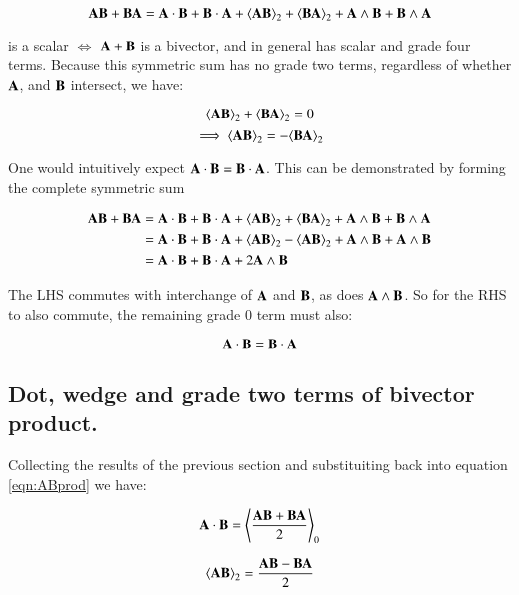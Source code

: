\documentclass{article}      %
\newcommand{\gpgrade}[2] {{\left\langle{{#1}}\right\rangle}_{#2}}
\newcommand{\gpgradetwo}[1] {\gpgrade{#1}{2}}
\begin{document}
\[
\BA \BB + \BB \BA = 
\BA \cdot \BB + \BB \cdot \BA
+\gpgradetwo{\BA \BB} + \gpgradetwo{\BB \BA}
+\BA \wedge \BB + \BB \wedge \BA
\]

is a scalar $\iff$ 
$\mathbf{A} + \mathbf{B}$ is a bivector, and in general has scalar and grade four terms.
Because this symmetric sum has no grade two terms, 
regardless of whether $\mathbf{A}$, and $\mathbf{B}$ intersect, we have:

\[
\gpgradetwo{\BA \BB} + \gpgradetwo{\BB \BA} = 0
\]
\begin{equation}\label{eqn:signgradetwo}
\implies
\gpgradetwo{\BA \BB} = -\gpgradetwo{\BB \BA}
\end{equation}

One would intuitively expect $\mathbf{A} \cdot \mathbf{B} = \mathbf{B} \cdot \mathbf{A}$.  This can be
demonstrated by forming the complete symmetric sum

\begin{align*}
\BA \BB + \BB \BA 
&= 
{\BA \cdot \BB} +{\BB \cdot \BA}
+\gpgrade{\BA \BB}{2} +\gpgrade{\BB \BA}{2}
+{\BA \wedge \BB} + {\BB \wedge \BA} \\
&= 
{\BA \cdot \BB} +{\BB \cdot \BA}
+\gpgrade{\BA \BB}{2} -\gpgrade{\BA \BB}{2}
+{\BA \wedge \BB} + {\BA \wedge \BB} \\
&= 
{\BA \cdot \BB} +{\BB \cdot \BA}
+2{\BA \wedge \BB} \\
\end{align*}

The LHS commutes with interchange of $\mathbf{A}$ and $\mathbf{B}$, as does
${\mathbf{A} \wedge \mathbf{B}}$.  So for the RHS to also commute, the remaining grade 0 term
must also:

\begin{equation}\label{eqn:dotsign}
\mathbf{A} \cdot \mathbf{B} = \mathbf{B} \cdot \mathbf{A}
\end{equation}

\subsection{ Dot, wedge and grade two terms of bivector product. }

Collecting the results of the previous section and substituiting back
into equation \ref{eqn:ABprod} we have:

\begin{equation}\label{eqn:AdotB}
\BA \cdot \BB = \gpgrade{\frac{\BA \BB + \BB\BA}{2}}{0}
\end{equation}

\begin{equation}\label{eqn:AtwoB}
\gpgradetwo{\BA \BB} = \frac{\BA \BB - \BB\BA}{2}
\end{equation}
\end{document}
